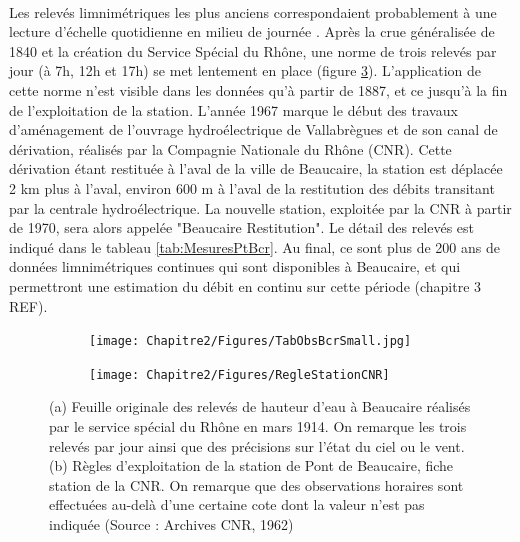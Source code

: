 	\paragraph{} Les relevés limnimétriques les plus anciens correspondaient probablement à une lecture d'échelle quotidienne en milieu de journée \citep{pichard_hauteurs_2013}. Après la crue généralisée de 1840 et la création du Service Spécial du Rhône, une norme de trois relevés par jour (à 7h, 12h et 17h) se met lentement en place (figure \ref{fig:RelevesPt}). L'application de cette norme n'est visible dans les données qu'à partir de 1887, et ce jusqu'à la fin de l'exploitation de la station.  L'année 1967 marque le début des travaux d'aménagement de l'ouvrage hydroélectrique de Vallabrègues et de son canal de dérivation, réalisés par la Compagnie Nationale du Rhône (CNR). Cette dérivation étant restituée à l'aval de la ville de Beaucaire, la station est déplacée 2 km plus à l'aval, environ 600 m à l'aval de la restitution des débits transitant par la centrale hydroélectrique. La nouvelle station, exploitée par la CNR à partir de 1970, sera alors appelée "Beaucaire Restitution". Le détail des relevés est indiqué dans le tableau \ref{tab:MesuresPtBcr}. Au final, ce sont plus de 200 ans de données limnimétriques continues qui sont disponibles à Beaucaire, et qui permettront une estimation du débit en continu sur cette période (chapitre 3 REF). 
	
	\begin{figure}[h]
          \centering
            \begin{subfigure}{0.49\linewidth}
            \centering
            	\texttt{[image: Chapitre2/Figures/TabObsBcrSmall.jpg]}\hfill
            	\caption{}
            	\label{subfig:TabObsPt}
            \end{subfigure}
            \begin{subfigure}{0.49\linewidth}
            \centering
            	\texttt{[image: Chapitre2/Figures/RegleStationCNR]}
            	\caption{}
           		\label{subfig:RegleCNR}
            \end{subfigure}
      \caption{(a) Feuille originale des relevés de hauteur d'eau à Beaucaire réalisés par le service spécial du Rhône en mars 1914. On remarque les trois relevés par jour ainsi que des précisions sur l'état du ciel ou le vent. (b) Règles d'exploitation de la station de Pont de Beaucaire, fiche station de la CNR. On remarque que des observations horaires sont effectuées au-delà d'une certaine cote dont la valeur n'est pas indiquée (Source : Archives CNR, 1962)}
	 \label{fig:RelevesPt}
	\end{figure}            
            

